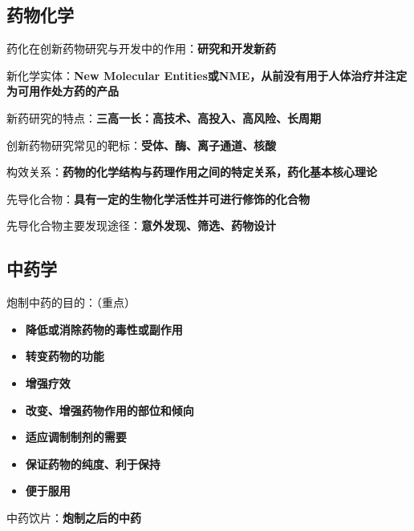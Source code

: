 \subsection{药物化学}%
\label{sub:复习：药物化学}
\begin{notation}
    药化在创新药物研究与开发中的作用：\textbf{研究和开发新药}
\end{notation}
\begin{notation}
    新化学实体：\textbf{New Molecular Entities或NME，从前没有用于人体治疗并注定为可用作处方药的产品}
\end{notation}
\begin{notation}
    新药研究的特点：\textbf{三高一长：高技术、高投入、高风险、长周期}
\end{notation}
\begin{notation}
创新药物研究常见的靶标：\textbf{受体、酶、离子通道、核酸}
\end{notation}
\begin{notation}
    构效关系：\textbf{药物的化学结构与药理作用之间的特定关系，药化基本核心理论}
\end{notation}
\begin{notation}
先导化合物：\textbf{具有一定的生物化学活性并可进行修饰的化合物}

先导化合物主要发现途径：\textbf{意外发现、筛选、药物设计}
\end{notation}
\subsection{中药学}%
\label{sub:复习：中药学}
\begin{notation}
    炮制中药的目的：（重点）
    \begin{itemize}
        \item \textbf{降低或消除药物的毒性或副作用}
        \item \textbf{转变药物的功能}
        \item \textbf{增强疗效}
        \item \textbf{改变、增强药物作用的部位和倾向}
        \item \textbf{适应调制制剂的需要}
        \item \textbf{保证药物的纯度、利于保持}
        \item \textbf{便于服用}
    \end{itemize}
\end{notation}
\begin{notation}
    中药饮片：\textbf{炮制之后的中药}
\end{notation}

